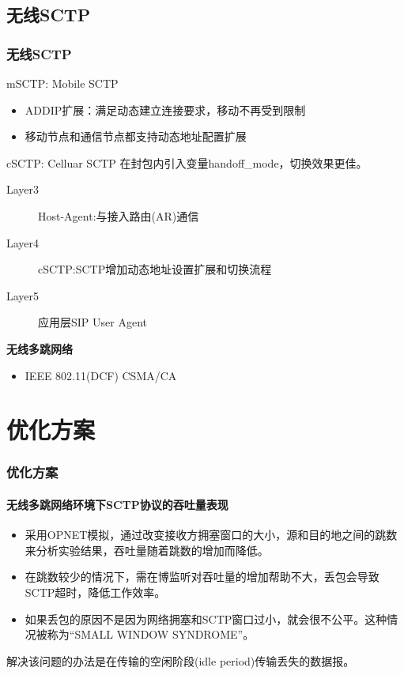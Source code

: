 \documentclass[xcolor={usenames,dvipsnames}]{beamer}
\begin{document}
\subsection{无线SCTP}
\begin{frame}
	\frametitle{无线SCTP}
	\begin{alertblock}{mSCTP: Mobile SCTP}
		\begin{itemize}
			\item ADDIP扩展：满足动态建立连接要求，移动不再受到限制
			\item 移动节点和通信节点都支持动态地址配置扩展
		\end{itemize}
	\end{alertblock}
	
	\begin{block}{cSCTP: Celluar SCTP}
		在封包内引入变量handoff\_mode，切换效果更佳。
		\begin{description}
			\item[Layer3] Host-Agent:与接入路由(AR)通信
			\item[Layer4] cSCTP:SCTP增加动态地址设置扩展和切换流程
			\item[Layer5] 应用层SIP User Agent
		\end{description}	
    \end{block}
    	\begin{block}{\textbf{无线多跳网络}\cite{aydin2009performance}}
    		\begin{itemize}
    			\item IEEE 802.11(DCF)  CSMA/CA
    		\end{itemize}
    	\end{block}
\end{frame}


\section{优化方案}
\begin{frame}
	\frametitle{\textbf{优化方案}}
	\framesubtitle{\textbf{无线多跳网络环境下SCTP协议的吞吐量表现}}
	\begin{itemize}
		\item 采用OPNET模拟，通过改变接收方拥塞窗口的大小，源和目的地之间的跳数来分析实验结果，吞吐量随着跳数的增加而降低。
		\item 在跳数较少的情况下，需在博监听对吞吐量的增加帮助不大，丢包会导致SCTP超时，降低工作效率。
		\item 如果丢包的原因不是因为网络拥塞和SCTP窗口过小，就会很不公平。这种情况被称为“SMALL WINDOW SYNDROME”。
	\end{itemize}
	\begin{alertblock}{}
		解决该问题的办法是在传输的空闲阶段(idle period)传输丢失的数据报。
	\end{alertblock}
\end{frame}
\end{document}
